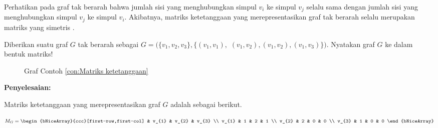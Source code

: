 {{{            \noindent
            Perhatikan pada graf tak berarah bahwa jumlah sisi yang menghubungkan simpul $v_{i}$ ke simpul $v_{j}$ selalu sama
            dengan jumlah sisi yang menghubungkan simpul $v_{j}$ ke simpul $v_{i}$.
            Akibatnya, matriks ketetanggaan yang merepresentasikan graf tak berarah selalu merupakan matriks yang simetris .

            \begin{contoh}
                \label{con:Matriks ketetanggaan}
                Diberikan suatu graf $G$ tak berarah sebagai $G=(\{v_{1},v_{2},v_{3}\},\{(v_{1},v_{1}),$ $(v_{1},v_{2}),(v_{1},v_{2}),(v_{1},v_{3})\})$.
                Nyatakan graf $G$ ke dalam bentuk matriks!

                \begin{figure}\label{gam:Contoh Matriks Ketetanggaan}
                    \centering
                    \vspace{-7mm}
                    \caption{Graf Contoh \ref{con:Matriks ketetanggaan}}
                \end{figure}

                \noindent
                \textbf{Penyelesaian:}

                {\noindent
                    Matriks ketetanggaan yang merepresentasikan graf $G$ adalah sebagai berikut.

                    \begin{equation*}
                        M_{G} =
                        \begin{bNiceArray}{ccc}[first-row,first-col]
                            & v_{1} & v_{2} & v_{3} \\
                            v_{1} & 1     & 2     & 1     \\
                            v_{2} & 2     & 0     & 0     \\
                            v_{3} & 1     & 0     & 0
                        \end{bNiceArray}
                    \end{equation*}
                }
            \end{contoh}

}}}
